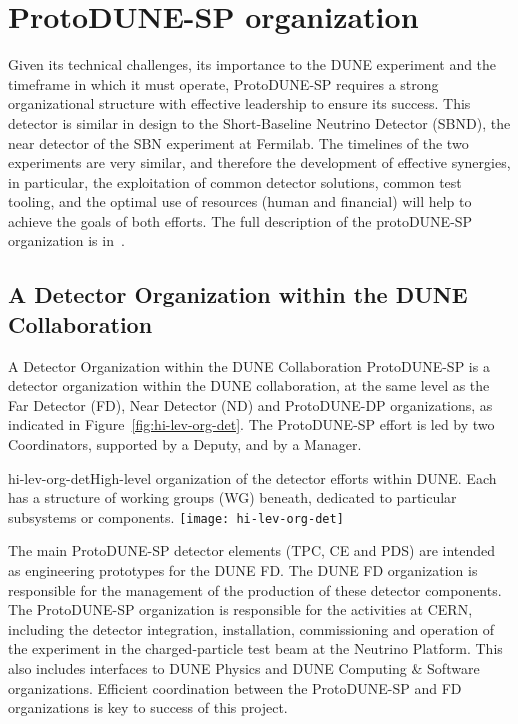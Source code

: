 
\section{ProtoDUNE-SP organization}

Given its technical challenges, its importance to the DUNE experiment and the timeframe in which it must operate, ProtoDUNE-SP requires a strong organizational structure with effective leadership to ensure its success. This detector is similar in design to the Short-Baseline Neutrino Detector (SBND), the near detector of the SBN experiment at Fermilab. The timelines of the two experiments are very similar, and therefore the development of effective synergies, in particular, the exploitation of common detector solutions, common test tooling, and the optimal use of resources (human and financial) will help to achieve the goals of both efforts.  The full description of the protoDUNE-SP organization is in~\cite{pdune-sp-org}.

\subsection{A Detector Organization within the DUNE Collaboration}

A Detector Organization within the DUNE Collaboration
ProtoDUNE-SP is a detector organization within the DUNE collaboration, at the same level as the Far Detector (FD), Near Detector (ND) and ProtoDUNE-DP organizations, as indicated in Figure~\ref{fig:hi-lev-org-det}. The ProtoDUNE-SP effort is led by two Coordinators, supported by a Deputy, and by a Manager. 

\begin{cdrfigure}{hi-lev-org-det}{High-level organization of the detector efforts within DUNE. Each has a structure of working groups (WG) beneath, dedicated to particular subsystems or components.}
 \texttt{[image: hi-lev-org-det]}
\end{cdrfigure}

The main ProtoDUNE-SP detector elements (TPC, CE and PDS) are intended as engineering prototypes for the DUNE FD. The DUNE FD organization is responsible for the management of the production of these detector components. The ProtoDUNE-SP organization is responsible for the activities at CERN, including the detector integration, installation, commissioning and operation of the experiment in the charged-particle test beam at the Neutrino Platform.  This also includes interfaces to DUNE Physics and DUNE Computing \& Software organizations. Efficient coordination between the ProtoDUNE-SP and FD organizations is key to success of this project.

